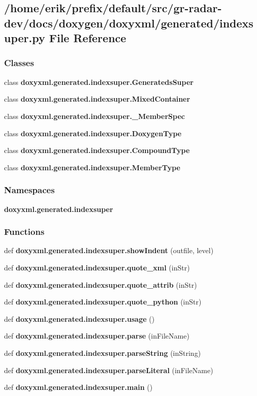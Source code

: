 \subsection{/home/erik/prefix/default/src/gr-\/radar-\/dev/docs/doxygen/doxyxml/generated/indexsuper.py File Reference}
\label{indexsuper_8py}
\subsubsection*{Classes}
\begin{DoxyCompactItemize}
\item 
class {\bf doxyxml.\+generated.\+indexsuper.\+Generateds\+Super}
\item 
class {\bf doxyxml.\+generated.\+indexsuper.\+Mixed\+Container}
\item 
class {\bf doxyxml.\+generated.\+indexsuper.\+\_\+\+Member\+Spec}
\item 
class {\bf doxyxml.\+generated.\+indexsuper.\+Doxygen\+Type}
\item 
class {\bf doxyxml.\+generated.\+indexsuper.\+Compound\+Type}
\item 
class {\bf doxyxml.\+generated.\+indexsuper.\+Member\+Type}
\end{DoxyCompactItemize}
\subsubsection*{Namespaces}
\begin{DoxyCompactItemize}
\item 
 {\bf doxyxml.\+generated.\+indexsuper}
\end{DoxyCompactItemize}
\subsubsection*{Functions}
\begin{DoxyCompactItemize}
\item 
def {\bf doxyxml.\+generated.\+indexsuper.\+show\+Indent} (outfile, level)
\item 
def {\bf doxyxml.\+generated.\+indexsuper.\+quote\+\_\+xml} (in\+Str)
\item 
def {\bf doxyxml.\+generated.\+indexsuper.\+quote\+\_\+attrib} (in\+Str)
\item 
def {\bf doxyxml.\+generated.\+indexsuper.\+quote\+\_\+python} (in\+Str)
\item 
def {\bf doxyxml.\+generated.\+indexsuper.\+usage} ()
\item 
def {\bf doxyxml.\+generated.\+indexsuper.\+parse} (in\+File\+Name)
\item 
def {\bf doxyxml.\+generated.\+indexsuper.\+parse\+String} (in\+String)
\item 
def {\bf doxyxml.\+generated.\+indexsuper.\+parse\+Literal} (in\+File\+Name)
\item 
def {\bf doxyxml.\+generated.\+indexsuper.\+main} ()
\end{DoxyCompactItemize}

